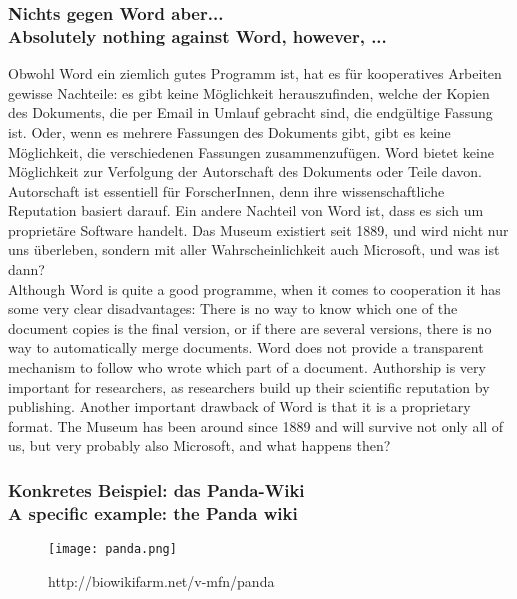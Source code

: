 \documentclass[12pt]{beamer}
\begin{document}
{\scriptsize
\begin{frame}
  \frametitle{Nichts gegen Word\textsuperscript{\tiny\textregistered} aber... \\
    \textcolor{mfn_green}{Absolutely nothing against Word\textsuperscript{\tiny\textregistered}, however, ...}}
  Obwohl Word ein ziemlich gutes Programm ist, hat es für kooperatives Arbeiten gewisse Nachteile: es gibt keine Möglichkeit herauszufinden, welche der Kopien des Dokuments, die per Email in Umlauf gebracht sind, die endgültige Fassung ist. Oder, wenn es mehrere Fassungen des Dokuments gibt, gibt es keine Möglichkeit, die verschiedenen Fassungen zusammenzufügen. Word bietet keine Möglichkeit zur Verfolgung der Autorschaft des Dokuments oder Teile davon. Autorschaft ist essentiell für ForscherInnen, denn ihre wissenschaftliche Reputation basiert darauf. Ein andere Nachteil von Word ist, dass es sich um proprietäre Software handelt. Das Museum existiert seit 1889, und wird nicht nur uns überleben, sondern mit aller Wahrscheinlichkeit auch Microsoft, und was ist dann?\\
  \bigskip
  \textcolor{mfn_green}{Although Word is quite a good programme, when it comes to cooperation it has some very clear disadvantages: There is no way to know which one of the document copies is the final version, or if there are several versions, there is no way to automatically merge documents. Word does not provide a transparent mechanism to follow who wrote which part of a document. Authorship is very important for researchers, as researchers build up their scientific reputation by publishing. Another important drawback of Word is that it is a proprietary format. The Museum has been around since 1889 and will survive not only all of us, but very probably also Microsoft, and what happens then?}
\end{frame}
}
%
%

\begin{frame}
  \frametitle{Konkretes Beispiel: das Panda-Wiki\\\textcolor{mfn_green}{A specific example: the Panda wiki}}
  \begin{figure}
    \texttt{[image: panda.png]}
    \caption{http://biowikifarm.net/v-mfn/panda}
  \end{figure}
\end{frame}
\end{document}
